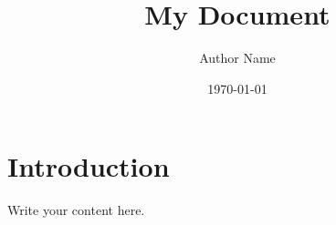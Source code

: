 \documentclass[12pt,a4paper]{article}
\title{My Document}
\author{Author Name}
\date{\today}
\begin{document}
\maketitle

\section{Introduction}
Write your content here.
\end{document}
